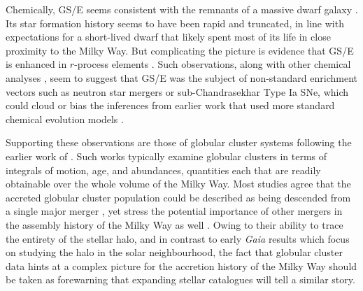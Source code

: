 Chemically, GS/E seems consistent with the remnants of a massive dwarf galaxy \parencite{fernandezalvar18,vincenzo19,monty20,hasselquist21}. Its star formation history seems to have been rapid and truncated, in line with expectations for a short-lived dwarf that likely spent most of its life in close proximity to the Milky Way. But complicating the picture is evidence that GS/E is enhanced in $r$-process elements \parencite{aguado21,matsuno21}. Such observations, along with other chemical analyses \parencite{sanders21}, seem to suggest that GS/E was the subject of non-standard enrichment vectors such as neutron star mergers or sub-Chandrasekhar Type Ia SNe, which could cloud or bias the inferences from earlier work that used more standard chemical evolution models \parencite[on which basis][ argues against a rapid and truncated chemical enrichment]{sanders21}. 

Supporting these observations are those of globular cluster systems following the earlier work of \textcite{myeong18}. Such works typically examine globular clusters in terms of integrals of motion, age, and abundances, quantities each that are readily obtainable over the whole volume of the Milky Way. Most studies agree that the accreted globular cluster population could be described as being descended from a single major merger \parencite{massari19}, yet stress the potential importance of other mergers in the assembly history of the Milky Way as well \parencite{myeong19,kruijssen19b,forbes20}. Owing to their ability to trace the entirety of the stellar halo, and in contrast to early \textit{Gaia} results which focus on studying the halo in the solar neighbourhood, the fact that globular cluster data hints at a complex picture for the accretion history of the Milky Way should be taken as forewarning that expanding stellar catalogues will tell a similar story.

